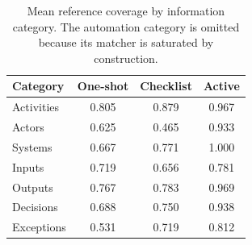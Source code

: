 \begin{table}[!htbp]
\caption{Mean reference coverage by information category. The automation category is omitted because its matcher is saturated by construction.}
\label{tab:category-coverage}
\centering
\small
\begin{tabular}{lccc}
\toprule
Category & One-shot & Checklist & Active \\
\midrule
Activities & 0.805 & 0.879 & 0.967 \\
Actors & 0.625 & 0.465 & 0.933 \\
Systems & 0.667 & 0.771 & 1.000 \\
Inputs & 0.719 & 0.656 & 0.781 \\
Outputs & 0.767 & 0.783 & 0.969 \\
Decisions & 0.688 & 0.750 & 0.938 \\
Exceptions & 0.531 & 0.719 & 0.812 \\
\bottomrule
\end{tabular}
\end{table}
